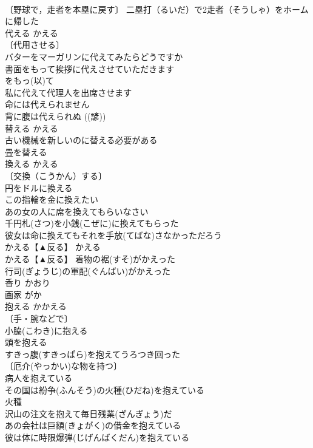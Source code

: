 \documentclass[8pt]{extreport}
\begin{document}
\begin{CJK}{UTF8}{min}
\\	〔野球で，走者を本塁に戻す〕 二塁打（るいだ）で2走者（そうしゃ）をホームに帰した 
\\	代える	かえる	
\\	〔代用させる〕
\\	バターをマーガリンに代えてみたらどうですか 
\\	書面をもって挨拶に代えさせていただきます 
\\	をもっ(以)て 
\\	私に代えて代理人を出席させます 
\\	命には代えられません 
\\	背に腹は代えられぬ ((諺)) 
\\	替える	かえる	
\\	古い機械を新しいのに替える必要がある 
\\	畳を替える 
\\	換える	かえる	
\\	〔交換（こうかん）する〕
\\	円をドルに換える 
\\	この指輪を金に換えたい 
\\	あの女の人に席を換えてもらいなさい 
\\	千円札(さつ)を小銭(こぜに)に換えてもらった 
\\	彼女は命に換えてもそれを手放(てばな)さなかっただろう 
\\	かえる【▲反る】	かえる	
\\	かえる【▲反る】 着物の裾(すそ)がかえった 
\\	行司(ぎょうじ)の軍配(ぐんばい)がかえった 
\\	香り	かおり	
\\	画家	がか	
\\	抱える	かかえる	
\\	〔手・腕などで〕 
\\	小脇(こわき)に抱える 
\\	頭を抱える 
\\	すきっ腹(すきっぱら)を抱えてうろつき回った 
\\	〔厄介(やっかい)な物を持つ〕 
\\	病人を抱えている 
\\	その国は紛争(ふんそう)の火種(ひだね)を抱えている 
\\	火種　
\\	沢山の注文を抱えて毎日残業(ざんぎょう)だ 
\\	あの会社は巨額(きょがく)の借金を抱えている 
\\	彼は体に時限爆弾(じげんばくだん)を抱えている 

\end{CJK}
\end{document}
